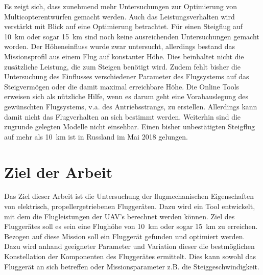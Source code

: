 Es zeigt sich, dass zunehmend mehr Untersuchungen zur Optimierung von Multicopterentwürfen gemacht werden. Auch das Leistungsverhalten wird verstärkt mit Blick auf eine Optimierung betrachtet. Für einen Steigflug auf \SI{10}{km} oder sogar \SI{15}{km} sind noch keine ausreichenden Untersuchungen gemacht worden. Der Höheneinfluss wurde zwar untersucht, allerdings bestand das Missionsprofil aus einem Flug auf konstanter Höhe. Dies beinhaltet nicht die zusätzliche Leistung, die zum Steigen benötigt wird. Zudem fehlt bisher die Untersuchung des Einflusses verschiedener Parameter des Flugsystems auf das Steigvermögen oder die damit maximal erreichbare Höhe. Die Online Tools erweisen sich als nützliche Hilfe, wenn es darum geht eine Vorabauslegung des gewünschten Flugsystems, v.a. des Antriebsstrangs, zu erstellen. Allerdings kann damit nicht das Flugverhalten an sich bestimmt werden. Weiterhin sind die zugrunde gelegten Modelle nicht einsehbar. Einen bisher unbestätigten Steigflug auf mehr als \SI{10}{km} ist \cite{Anderson.2018} in Russland im Mai 2018 gelungen. 



\section{Ziel der Arbeit}
\label{sec:ziel_der_atrbeit}
Das Ziel dieser Arbeit ist die Untersuchung der flugmechanischen Eigenschaften von elektrisch, propellergetriebenen Fluggeräten. Dazu wird ein Tool entwickelt, mit dem die Flugleistungen der UAV's berechnet werden können. Ziel des Fluggerätes soll es sein eine Flughöhe von \SI{10}{km} oder sogar \SI{15}{km} zu erreichen. Bezogen auf diese Mission soll ein Fluggerät gefunden und optimiert werden. Dazu wird anhand geeigneter Parameter und Variation dieser die bestmöglichen Konstellation der Komponenten des Fluggerätes ermittelt. Dies kann sowohl das Fluggerät an sich betreffen oder Missionsparameter z.B. die Steiggeschwindigkeit.

